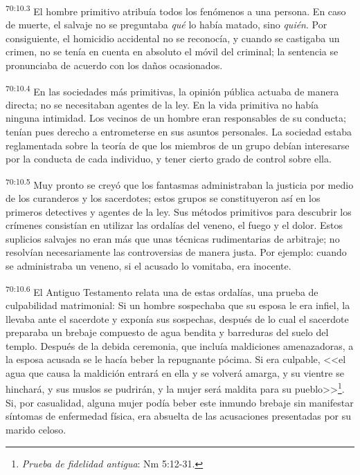 \documentclass[twoside, 11pt]{book}
\begin{document}
\par
\textsuperscript{70:10.3} El hombre primitivo atribuía todos los fenómenos a una persona. En caso de muerte, el salvaje no se preguntaba \textit{qué} lo había matado, sino \textit{quién}. Por consiguiente, el homicidio accidental no se reconocía, y cuando se castigaba un crimen, no se tenía en cuenta en absoluto el móvil del criminal; la sentencia se pronunciaba de acuerdo con los daños ocasionados.

\par
\textsuperscript{70:10.4} En las sociedades más primitivas, la opinión pública actuaba de manera directa; no se necesitaban agentes de la ley. En la vida primitiva no había ninguna intimidad. Los vecinos de un hombre eran responsables de su conducta; tenían pues derecho a entrometerse en sus asuntos personales. La sociedad estaba reglamentada sobre la teoría de que los miembros de un grupo debían interesarse por la conducta de cada individuo, y tener cierto grado de control sobre ella.

\par
\textsuperscript{70:10.5} Muy pronto se creyó que los fantasmas administraban la justicia por medio de los curanderos y los sacerdotes; estos grupos se constituyeron así en los primeros detectives y agentes de la ley. Sus métodos primitivos para descubrir los crímenes consistían en utilizar las ordalías del veneno, el fuego y el dolor. Estos suplicios salvajes no eran más que unas técnicas rudimentarias de arbitraje; no resolvían necesariamente las controversias de manera justa. Por ejemplo: cuando se administraba un veneno, si el acusado lo vomitaba, era inocente.

\par
\textsuperscript{70:10.6} El Antiguo Testamento relata una de estas ordalías, una prueba de culpabilidad matrimonial: Si un hombre sospechaba que su esposa le era infiel, la llevaba ante el sacerdote y exponía sus sospechas, después de lo cual el sacerdote preparaba un brebaje compuesto de agua bendita y barreduras del suelo del templo. Después de la debida ceremonia, que incluía maldiciones amenazadoras, a la esposa acusada se le hacía beber la repugnante pócima. Si era culpable, <<el agua que causa la maldición entrará en ella y se volverá amarga, y su vientre se hinchará, y sus muslos se pudrirán, y la mujer será maldita para su pueblo>>\footnote{\textit{Prueba de fidelidad antigua}: Nm 5:12-31.}. Si, por casualidad, alguna mujer podía beber este inmundo brebaje sin manifestar síntomas de enfermedad física, era absuelta de las acusaciones presentadas por su marido celoso.
\end{document}
